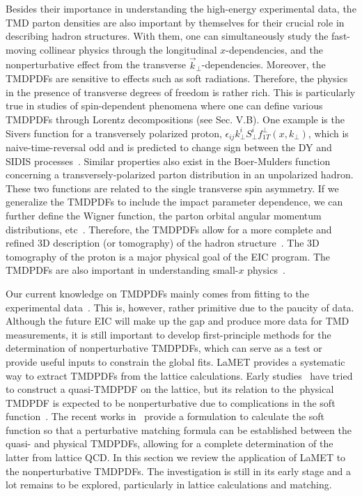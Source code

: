 Besides their importance in understanding the high-energy experimental data, the TMD parton densities are also important by themselves for their crucial role in describing hadron structures. With them, one can simultaneously study the fast-moving collinear physics through the longitudinal $x$-dependencies, and the nonperturbative effect from the transverse $\vec{k}_\perp$-dependencies. Moreover, the TMDPDFs are sensitive to effects such as soft radiations. Therefore, the physics in the presence of transverse degrees of freedom is rather rich. This is particularly true in studies of spin-dependent phenomena where one can define various TMDPDFs through Lorentz decompositions (see Sec. V.B). One example is the Sivers function for a transversely polarized proton, $\epsilon_{ij}k^i_\perp S^i_\perp f^{\perp}_{1T}(x,k_\perp)$, which is naive-time-reversal odd and is predicted to change sign between the DY and SIDIS processes~\cite{Collins:2011zzd}. Similar properties also exist in the Boer-Mulders function~\cite{Boer:1997nt} concerning a transversely-polarized parton
distribution in an unpolarized hadron. These two functions are related to the single transverse spin asymmetry. If we generalize the TMDPDFs to include the impact parameter dependence, we can further define the Wigner function, the parton orbital angular momentum distributions, etc~\cite{Belitsky:2003nz, Lorce:2011ni}. Therefore, the TMDPDFs allow for a more complete and refined 3D description (or tomography) of the hadron structure~\cite{Burkardt:2000za, Boer:2011fh}.
The 3D tomography of the proton is a major physical goal of the EIC program. The TMDPDFs are also important
in understanding small-$x$ physics~\cite{Kuraev:1977fs,Balitsky:1978ic,Balitsky:1995ub,Kovchegov:1999yj,Kovchegov:2012mbw}.

Our current knowledge on TMDPDFs mainly comes from fitting to the experimental data~\cite{Landry:1999an,Konychev:2005iy,Su:2014wpa,Echevarria:2014xaa,Kang:2015msa,Bacchetta:2017gcc,Scimemi:2017etj,Bertone:2019nxa,Scimemi:2019cmh,Bacchetta:2019sam}. This is, however, rather primitive due to the paucity of data. Although the future EIC will make up the gap and produce more data for TMD measurements, it is still important to develop first-principle methods for the determination of nonperturbative TMDPDFs, which can serve as a test or provide useful inputs to constrain the global fits.
LaMET provides a systematic way to extract TMDPDFs from the lattice calculations. Early studies~\cite{Ji:2014hxa,Ji:2018hvs,Ebert:2018gzl,Ebert:2019okf} have tried to construct a quasi-TMDPDF on the lattice, but its relation to the physical TMDPDF is expected to be nonperturbative due to complications in the soft function~\cite{Ebert:2019okf}. The recent works in~\cite{Ji:2019sxk,Ji:2019ewn} provide a formulation
to calculate the soft function so that a perturbative matching formula can be established between the quasi- and physical TMDPDFs, allowing for a complete determination of the latter from lattice QCD. In this section we review the application of LaMET to the nonperturbative TMDPDFs. The investigation is still in its early stage and a lot remains
to be explored, particularly in lattice calculations and matching.

